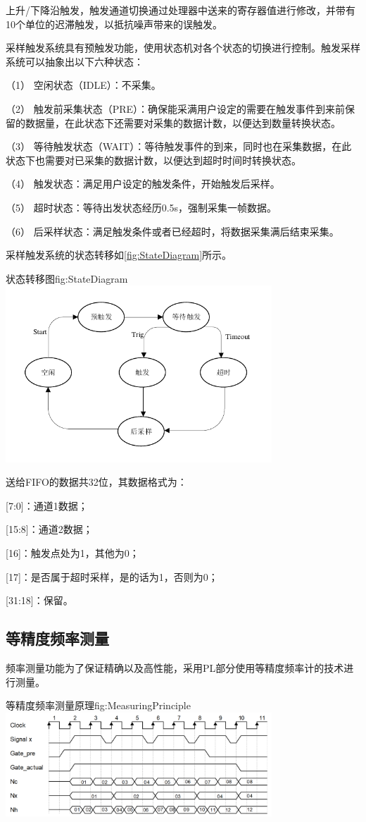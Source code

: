 \documentclass[supercite]{HustGraduPaper}
\begin{document}
	上升/下降沿触发，触发通道切换通过处理器中送来的寄存器值进行修改，并带有10个单位的迟滞触发，以抵抗噪声带来的误触发。
	
	采样触发系统具有预触发功能，使用状态机对各个状态的切换进行控制。触发采样系统可以抽象出以下六种状态：
	
	（1）	空闲状态（IDLE）：不采集。
	
	（2）	触发前采集状态（PRE）：确保能采满用户设定的需要在触发事件到来前保留的数据量，在此状态下还需要对采集的数据计数，以便达到数量转换状态。
	
	（3）	等待触发状态（WAIT）：等待触发事件的到来，同时也在采集数据，在此状态下也需要对已采集的数据计数，以便达到超时时间时转换状态。
	
	（4）	触发状态：满足用户设定的触发条件，开始触发后采样。
	
	（5）	超时状态：等待出发状态经历0.5s，强制采集一帧数据。
	
	（6）	后采样状态：满足触发条件或者已经超时，将数据采集满后结束采集。
	
	采样触发系统的状态转移如\autoref{fig:StateDiagram}所示。
	\begin{generalfig}[htb]{状态转移图}{fig:StateDiagram}
		\includegraphics[width=10cm]{Figures/StateDiagram.pdf}
	\end{generalfig}		
	
	送给FIFO的数据共32位，其数据格式为：
	
	[7:0]：通道1数据；
	
	[15:8]：通道2数据；
	
	[16]：触发点处为1，其他为0；
	
	[17]：是否属于超时采样，是的话为1，否则为0；
	
	[31:18]：保留。
	
	\subsection{等精度频率测量}
	频率测量功能为了保证精确以及高性能，采用PL部分使用等精度频率计的技术进行测量。
	\begin{generalfig}[htb]{等精度频率测量原理}{fig:MeasuringPrinciple}
		\includegraphics[width=10cm]{Figures/MeasuringPrinciple.png}
	\end{generalfig}
\end{document}
